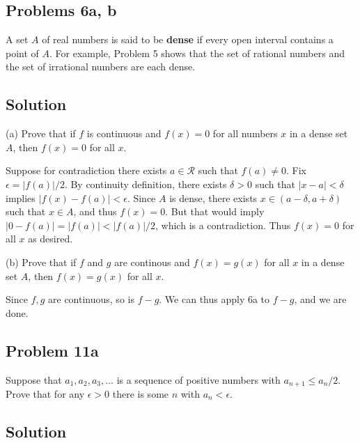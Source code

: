 \subsection*{Problems 6a, b}
A set $A$ of real numbers is said to be \textbf{dense} if every open
interval contains a point of $A$. For example, Problem 5 shows that
the set of rational numbers and the set of irrational numbers are each
dense.

\subsection*{Solution}

(a) Prove that if $f$ is continuous and $f(x)=0$ for all numbers $x$
in a dense set $A$, then $f(x)=0$ for all $x$.

\vs

Suppose for contradiction there exists $a\in\mathcal{R}$ such that
$f(a)\neq0$. Fix $\epsilon=|f(a)|/2$. By continuity definition, there exists
$\delta>0$ such that $|x-a|<\delta$ implies $|f(x)-f(a)|<\epsilon$. Since
$A$ is dense, there exists $x\in(a-\delta, a+\delta)$ such that
$x\in A$, and thus $f(x)=0$. But that would imply
$|0-f(a)|=|f(a)|<|f(a)|/2$, which is a contradiction. Thus $f(x)=0$
for all $x$ as desired.

\vs

(b) Prove that if $f$ and $g$ are continous and $f(x)=g(x)$ for all
$x$ in a dense set $A$, then $f(x)=g(x)$ for all $x$.

\vs

Since $f,g$ are continuous, so is $f-g$. We can thus apply 6a to
$f-g$, and we are done.

\subsection*{Problem 11a}
Suppose that $a_{1}, a_{2}, a_{3}, \ldots$ is a sequence of positive
numbers with $a_{n+1}\leq a_{n}/2$. Prove that for any $\epsilon>0$ there is
some $n$ with $a_{n}<\epsilon$.

\subsection*{Solution}



